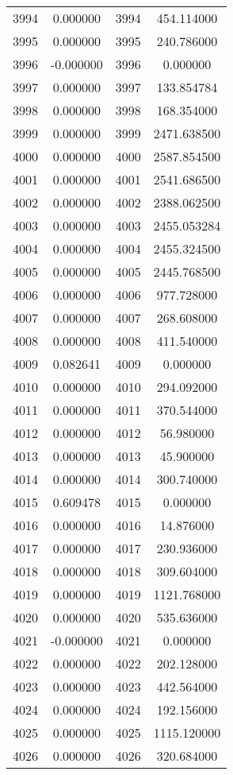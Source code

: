 \documentclass[12pt]{article}
\begin{document}
\begin{longtable}{@{}cccc@{}}
3994 & 0.000000 & 3994 & 454.114000 \\
3995 & 0.000000 & 3995 & 240.786000 \\
3996 & -0.000000 & 3996 & 0.000000 \\
3997 & 0.000000 & 3997 & 133.854784 \\
3998 & 0.000000 & 3998 & 168.354000 \\
3999 & 0.000000 & 3999 & 2471.638500 \\
4000 & 0.000000 & 4000 & 2587.854500 \\
4001 & 0.000000 & 4001 & 2541.686500 \\
4002 & 0.000000 & 4002 & 2388.062500 \\
4003 & 0.000000 & 4003 & 2455.053284 \\
4004 & 0.000000 & 4004 & 2455.324500 \\
4005 & 0.000000 & 4005 & 2445.768500 \\
4006 & 0.000000 & 4006 & 977.728000 \\
4007 & 0.000000 & 4007 & 268.608000 \\
4008 & 0.000000 & 4008 & 411.540000 \\
4009 & 0.082641 & 4009 & 0.000000 \\
4010 & 0.000000 & 4010 & 294.092000 \\
4011 & 0.000000 & 4011 & 370.544000 \\
4012 & 0.000000 & 4012 & 56.980000 \\
4013 & 0.000000 & 4013 & 45.900000 \\
4014 & 0.000000 & 4014 & 300.740000 \\
4015 & 0.609478 & 4015 & 0.000000 \\
4016 & 0.000000 & 4016 & 14.876000 \\
4017 & 0.000000 & 4017 & 230.936000 \\
4018 & 0.000000 & 4018 & 309.604000 \\
4019 & 0.000000 & 4019 & 1121.768000 \\
4020 & 0.000000 & 4020 & 535.636000 \\
4021 & -0.000000 & 4021 & 0.000000 \\
4022 & 0.000000 & 4022 & 202.128000 \\
4023 & 0.000000 & 4023 & 442.564000 \\
4024 & 0.000000 & 4024 & 192.156000 \\
4025 & 0.000000 & 4025 & 1115.120000 \\
4026 & 0.000000 & 4026 & 320.684000 \\

\end{longtable}
\end{document}
